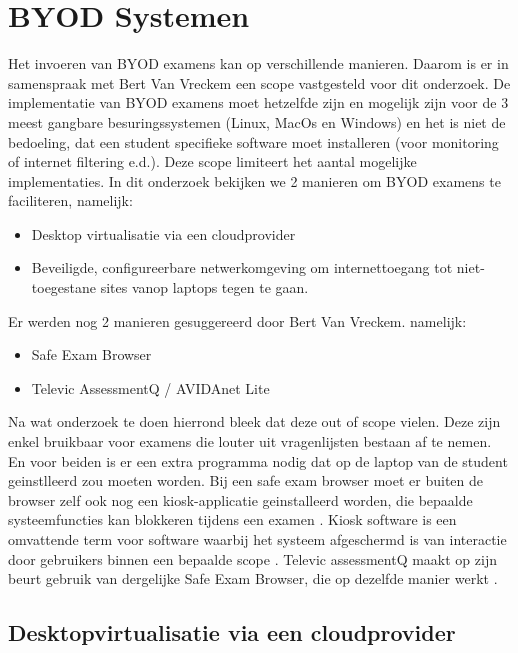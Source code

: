     
\section{BYOD Systemen}

Het invoeren van BYOD examens kan op verschillende manieren. Daarom is er in samenspraak met Bert Van Vreckem een scope vastgesteld voor dit onderzoek. De implementatie van BYOD examens moet hetzelfde zijn en mogelijk zijn voor de 3 meest gangbare besuringssystemen (Linux, MacOs en Windows) en het is niet de bedoeling, dat een student specifieke software moet installeren (voor monitoring of internet filtering e.d.). Deze scope limiteert het aantal mogelijke implementaties. In dit onderzoek bekijken we 2 manieren om BYOD examens te faciliteren, namelijk:

\begin{itemize} 
\item Desktop virtualisatie via een cloudprovider
\item Beveiligde, configureerbare netwerkomgeving om internettoegang tot niet-toegestane sites vanop laptops tegen te gaan.	
\end{itemize}

Er werden nog 2 manieren gesuggereerd door Bert Van Vreckem. namelijk:  
\begin{itemize}
	\item Safe Exam Browser 
	\item Televic AssessmentQ / AVIDAnet Lite
\end{itemize}

Na wat onderzoek te doen hierrond bleek dat deze out of scope vielen. Deze zijn enkel bruikbaar voor examens die louter uit vragenlijsten bestaan af te nemen. En voor beiden is er een extra programma nodig dat op de laptop van de student geinstlleerd zou moeten worden. Bij een safe exam browser moet er buiten de browser zelf ook nog een kiosk-applicatie geinstalleerd worden, die bepaalde systeemfuncties kan blokkeren tijdens een examen \autocite{SEB2019}. Kiosk software is een omvattende term voor software waarbij het systeem afgeschermd is van interactie door gebruikers binnen een bepaalde scope \autocite{Kio2009}. Televic assessmentQ maakt op zijn beurt gebruik van dergelijke Safe Exam Browser, die op dezelfde manier werkt \autocite{Tele2019}. 

\subsection{Desktopvirtualisatie via een cloudprovider}

